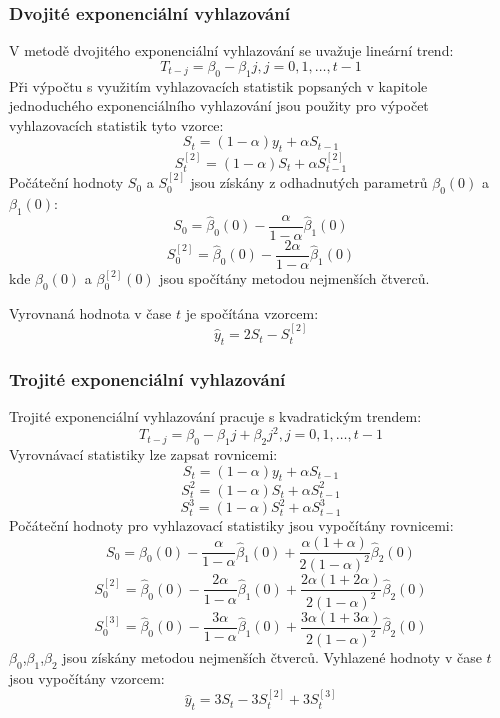 \documentclass[thesis=M,czech]{FITthesis}[2012/06/26]
\begin{document}
\subsubsection{Dvojité exponenciální vyhlazování}
V metodě dvojitého exponenciální vyhlazování se uvažuje lineární trend:
\[ T_{t - j} = \beta_{0} - \beta_{1}j, j = 0,1,\dots,t - 1 \]
Při výpočtu s využitím vyhlazovacích statistik popsaných v kapitole jednoduchého exponenciálního vyhlazování jsou použity pro výpočet vyhlazovacích statistik tyto vzorce:
\[ S_{t} = (1 - \alpha)y_{t} + \alpha S_{t - 1} \]
\[ S^{[2]}_{t} = (1 - \alpha)S_{t} + \alpha S^{[2]}_{t - 1} \]
Počáteční hodnoty $S_{0}$ a $S^{[2]}_{0}$ jsou získány z odhadnutých parametrů $\beta_{0}(0)$ a $\beta_{1}(0)$:
\[ S_{0} = \hat{\beta}_{0}(0) - \frac{\alpha}{1 - \alpha}\hat{\beta}_{1}(0) \]
\[ S_{0}^{[2]} = \hat{\beta}_{0}(0) - \frac{2\alpha}{1 - \alpha}\hat{\beta}_{1}(0) \]
kde $ \beta_{0}(0) $ a $ \beta_{0}^{[2]}(0) $ jsou spočítány metodou nejmenších čtverců.\par
Vyrovnaná hodnota v čase $ t $ je spočítána vzorcem:
\[ \hat{y}_{t} = 2S_{t} - S^{[2]}_{t} \] 
\subsubsection{Trojité exponenciální vyhlazování}
Trojité exponenciální vyhlazování pracuje s kvadratickým trendem:
\[ T_{t - j} = \beta_{0} - \beta_{1}j + \beta_{2}j^{2}, j = 0,1,\dots,t - 1 \]
Vyrovnávací statistiky lze zapsat rovnicemi:
\[ S_{t} = (1 - \alpha)y_{t} + \alpha S_{t - 1} \]
\[ S^{2}_{t} = (1 - \alpha)S_{t} + \alpha S^{2}_{t - 1} \]
\[ S^{3}_{t} = (1 - \alpha)S^{2}_{t} + \alpha S^{3}_{t - 1} \]
Počáteční hodnoty pro vyhlazovací statistiky jsou vypočítány rovnicemi:
\[ S_{0} = \hat{\beta}_{0}(0) - \frac{\alpha}{1 - \alpha}\hat{\beta}_{1}(0) + \frac{\alpha(1 + \alpha)}{2(1 - \alpha)^2}\hat{\beta}_2(0) \]
\[ S_{0}^{[2]} = \hat{\beta}_{0}(0) - \frac{2\alpha}{1 - \alpha}\hat{\beta}_{1}(0) + \frac{2\alpha(1 + 2\alpha)}{2(1 - \alpha)^2}\hat{\beta}_2(0) \]
\[ S_{0}^{[3]} = \hat{\beta}_{0}(0) - \frac{3\alpha}{1 - \alpha}\hat{\beta}_{1}(0) + \frac{3\alpha(1 + 3\alpha)}{2(1 - \alpha)^2}\hat{\beta}_2(0) \]
$ \beta_{0} $,$ \beta_{1} $,$ \beta_{2} $ jsou získány metodou nejmenších čtverců.\newline
Vyhlazené hodnoty v čase $t$ jsou vypočítány vzorcem:
\[ \hat{y}_t = 3S_{t} - 3S_{t}^{[2]} + 3S_{t}^{[3]} \]
\end{document}
